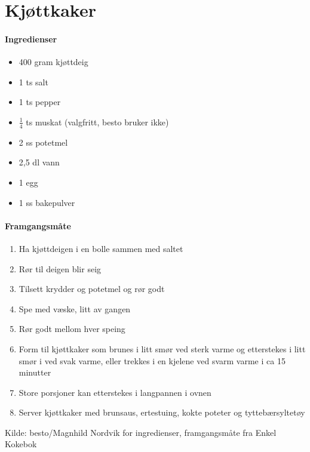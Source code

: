 \section{﻿Kjøttkaker}


\paragraph{Ingredienser}
\begin{itemize}[noitemsep]
	\item 400 gram kjøttdeig
	\item 1 ts salt
	\item 1 ts pepper
	\item $\frac{1}{4}$  ts muskat (valgfritt, besto bruker ikke)
	\item 2 ss potetmel
	\item 2,5 dl vann
	\item 1 egg
	\item 1 ss bakepulver
\end{itemize}

\paragraph{Framgangsmåte}
\begin{enumerate}[noitemsep]
	\item Ha kjøttdeigen i en bolle sammen med saltet
	\item Rør til deigen blir seig
	\item Tilsett krydder og potetmel og rør godt
	\item Spe med væske, litt av gangen
	\item Rør godt mellom hver speing
	\item Form til kjøttkaker som brunes i litt smør ved sterk varme og etterstekes i litt smør i ved svak varme, eller trekkes i en kjelene ved svarm varme i ca 15 minutter
	\item Store porsjoner kan etterstekes i langpannen i ovnen
	\item Server kjøttkaker med brunsaus, ertestuing, kokte poteter og tyttebærsyltetøy
\end{enumerate}


Kilde: besto/Magnhild Nordvik for ingredienser, framgangsmåte fra Enkel Kokebok

